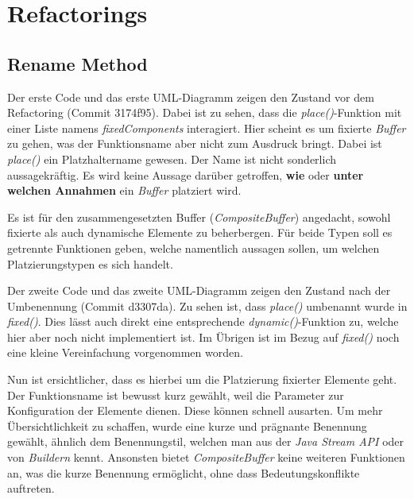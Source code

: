 \section{Refactorings}
\subsection{Rename Method}
Der erste Code und das erste UML-Diagramm zeigen den Zustand vor
dem Refactoring (Commit 3174f95). Dabei ist zu sehen, dass die \textit{place()}-Funktion
mit einer Liste namens \textit{fixedComponents} interagiert. Hier
scheint es um fixierte \textit{Buffer} zu gehen, was der Funktionsname
aber nicht zum Ausdruck bringt. Dabei ist \textit{place()} ein
Platzhaltername gewesen. Der Name ist nicht sonderlich aussagekräftig.
Es wird keine Aussage darüber getroffen, \textbf{wie} oder \textbf{unter
welchen Annahmen} ein \textit{Buffer} platziert wird.

Es ist für den zusammengesetzten Buffer (\textit{CompositeBuffer})
angedacht, sowohl fixierte als auch dynamische Elemente zu beherbergen.
Für beide Typen soll es getrennte Funktionen geben, welche namentlich
aussagen sollen, um welchen Platzierungstypen es sich handelt.

Der zweite Code und das zweite UML-Diagramm zeigen den Zustand nach
der Umbenennung (Commit d3307da). Zu sehen ist, dass \textit{place()}
umbenannt wurde in \textit{fixed()}. Dies lässt auch direkt eine
entsprechende \textit{dynamic()}-Funktion zu, welche hier aber noch
nicht implementiert ist. Im Übrigen ist im Bezug auf \textit{fixed()}
noch eine kleine Vereinfachung vorgenommen worden.

Nun ist ersichtlicher, dass es hierbei um die Platzierung fixierter
Elemente geht. Der Funktionsname ist bewusst kurz gewählt, weil
die Parameter zur Konfiguration der Elemente dienen. Diese können
schnell ausarten. Um mehr Übersichtlichkeit zu schaffen, wurde eine
kurze und prägnante Benennung gewählt, ähnlich dem Benennungstil,
welchen man aus der \textit{Java Stream API} oder von \textit{Buildern}
kennt. Ansonsten bietet \textit{CompositeBuffer} keine weiteren
Funktionen an, was die kurze Benennung ermöglicht, ohne dass
Bedeutungskonflikte auftreten.

